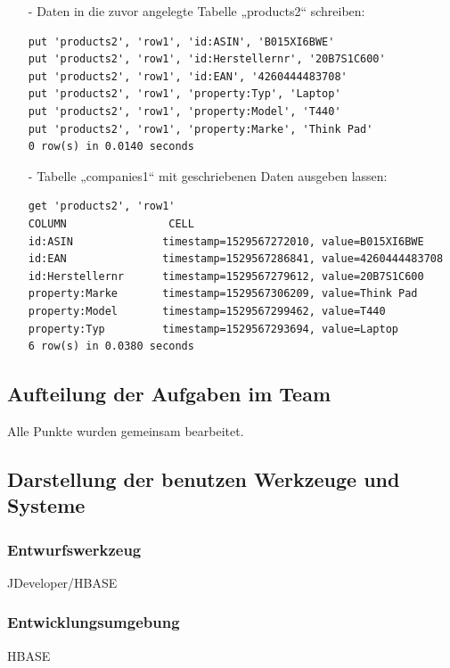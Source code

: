 \begin{itemize}
\item[-] Daten in die zuvor angelegte Tabelle „products2“ schreiben:
\begin{lstlisting}
put 'products2', 'row1', 'id:ASIN', 'B015XI6BWE'
put 'products2', 'row1', 'id:Herstellernr', '20B7S1C600'
put 'products2', 'row1', 'id:EAN', '4260444483708'
put 'products2', 'row1', 'property:Typ', 'Laptop'
put 'products2', 'row1', 'property:Model', 'T440'
put 'products2', 'row1', 'property:Marke', 'Think Pad'
0 row(s) in 0.0140 seconds
\end{lstlisting}

\item[-] Tabelle „companies1“ mit geschriebenen Daten ausgeben lassen:
\begin{lstlisting}
get 'products2', 'row1'
COLUMN                CELL
id:ASIN              timestamp=1529567272010, value=B015XI6BWE
id:EAN               timestamp=1529567286841, value=4260444483708
id:Herstellernr      timestamp=1529567279612, value=20B7S1C600
property:Marke       timestamp=1529567306209, value=Think Pad
property:Model       timestamp=1529567299462, value=T440
property:Typ         timestamp=1529567293694, value=Laptop
6 row(s) in 0.0380 seconds
\end{lstlisting}
\end{itemize}
\subsection*{Aufteilung der Aufgaben im Team}
Alle Punkte wurden gemeinsam bearbeitet.
\subsection*{Darstellung der benutzen Werkzeuge und Systeme}

\subsubsection*{Entwurfswerkzeug}
JDeveloper/HBASE
\subsubsection*{Entwicklungsumgebung}
HBASE
